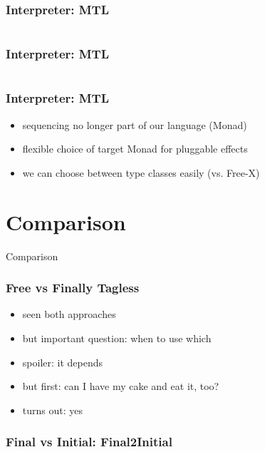\documentclass[aspectratio=169, hyperref={colorlinks, linkcolor=beamer@centricgreen}, urlcolor=links]{beamer}
\begin{document}
\begin{frame}
  \frametitle{Interpreter: MTL}
  \inputminted[fontsize=\footnotesize]{scala}{snippets/final-mtl-sample.scala}
\end{frame}

\begin{frame}
  \frametitle{Interpreter: MTL}
  \inputminted[fontsize=\footnotesize]{scala}{snippets/final-mtl-interp.scala}
\end{frame}

\begin{frame}
  \frametitle{Interpreter: MTL}
  \begin{itemize}
  \item sequencing no longer part of our language (Monad)
  \item flexible choice of target Monad for pluggable effects
  \item we can choose between type classes easily (vs. Free-X)
  \end{itemize}
\end{frame}

\section{Comparison}\label{sec:comparison}

\begin{frame}
  \begin{center}
    \Huge
    Comparison
  \end{center}
\end{frame}

\begin{frame}
  \frametitle{Free vs Finally Tagless}
  \begin{itemize}
  \item seen both approaches
  \item but important question: when to use which
  \item spoiler: it depends
  \item but first: can I have my cake and eat it, too?
  \item turns out: yes
  \end{itemize}
\end{frame}

\begin{frame}[fragile]
  \frametitle{Final vs Initial: Final2Initial}
  \inputminted[fontsize=\footnotesize]{scala}{snippets/final-to-initial.scala}
\end{frame}
\end{document}
